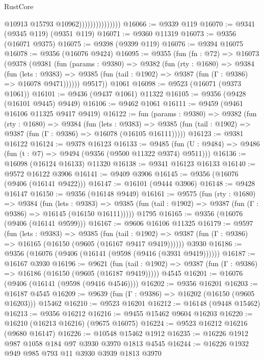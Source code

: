 \begin{lexlean}{RustCore}
\begin{coremodule}
                                  @10913
                                  @15793
                                  @10962)))))))))))))))
@16066 := @9339 @119
@16070 := @9341 (@9345 @119) (@9351 @119)
@16071 := @9360 @11319
@16073 := @9356 (@16071 @9375)
@16075 := @9398 (@9399 @119)
@16076 := @9394 @16075
@16078 := @9356 (@16076 @9424)
@16095 := @9355
    (fun (fn : @72) =>
    @16073
      (@9378
        (@9381
          (fun (params : @9380) =>
          @9382
            (fun (rty : @1680) =>
            @9384
              (fun (lets : @9383) =>
              @9385 (fun (tail : @1902) => @9387 (fun (Γ : @9386) => @16078 @9471))))))
        @9517))
    @1061
@16098 := @9523 (@16071 (@9373 @1061))
@16101 := @9436 (@9437 @1061) @11322
@16105 := @9356 (@9428 (@16101 @9445) @9449)
@16106 := @9462 @1061
@16111 := @9459 (@9461 @16106 @11325 @9417 @9419)
@16122 := fun (params : @9380) =>
  @9382
    (fun (rty : @1680) =>
    @9384
      (fun (lets : @9383) =>
      @9385 (fun (tail : @1902) => @9387 (fun (Γ : @9386) => @16078 (@16105 @16111)))))
@16123 := @9381 @16122
@16124 := @9378 @16123
@16133 := @9485
    (fun (U : @9484) => @9486 (fun (t : @7) => @9494 (@9356 (@9500 @11322 @9374) @9511)))
@16136 := @16098 (@16124 @16133) @11320
@16138 := @9341 @16123 @16133
@16140 := @9572 @16122 @3906
@16141 := @9409 @3906
@16145 := @9356 (@16076 (@9406 (@16141 @9422)))
@16147 := @16101 (@9444 @3906)
@16148 := @9428 @16147
@16150 := @9356 (@16148 @9449)
@16161 := @9575
    (fun (rty : @1680) =>
    @9384
      (fun (lets : @9383) =>
      @9385 (fun (tail : @1902) => @9387 (fun (Γ : @9386) => @16145 (@16150 @16111)))))
    @1795
@16165 := @9356 (@16076 (@9406 (@16141 @9599)))
@16167 := @9606 @16106 @11325
@16179 := @9597
    (fun (lets : @9383) =>
    @9385
      (fun (tail : @1902) =>
      @9387 (fun (Γ : @9386) => @16165 (@16150 (@9605 (@16167 @9417 @9419))))))
    @3930
@16186 := @9356 (@16076 (@9406 (@16141 (@9598 (@9416 (@3931 @9419))))))
@16187 := @16167 @3930
@16196 := @9621
    (fun (tail : @1902) => @9387 (fun (Γ : @9386) => @16186 (@16150 (@9605 (@16187 @9419)))))
    @4545
@16201 := @16076 (@9406 (@16141 (@9598 (@9416 @4546))))
@16202 := @9356 @16201
@16203 := @16187 @4545
@16209 := @9639 (fun (Γ : @9386) => @16202 (@16150 (@9605 @16203))) @15462
@16210 := @9523 @16201
@16212 := @16148 (@9448 @15462)
@16213 := @9356 @16212
@16216 := @9455 @15462 @9604 @16203
@16220 := @16210 (@16213 @16216) (@9675 @16075)
@16224 := @9523 @16212 @16216 (@9680 @16147)
@16226 := @10548 @15462 @1912
@16235 := @16226 @1912 @987 @1058 @184 @97 @3930 @3970 @1813 @4545
@16244 := @16226 @1932 @949 @985 @793 @11 @3930 @3939 @1813 @3970

\end{coremodule}
\end{lexlean}
